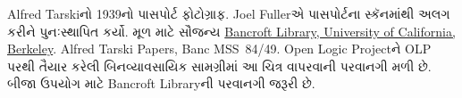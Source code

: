 Alfred Tarskiનો 1939નો પાસપોર્ટ ફોટોગ્રાફ. Joel Fullerએ પાસપોર્ટના સ્કૅનમાંથી
અલગ કરીને પુનઃસ્થાપિત કર્યો. મૂળ માટે સૌજન્ય
\href{http://www.lib.berkeley.edu/libraries/bancroft-library}{Bancroft Library,
University of California, Berkeley}. Alfred Tarski Papers, Banc MSS~84/49.
Open Logic Projectને OLP પરથી તૈયાર કરેલી બિનવ્યાવસાયિક સામગ્રીમાં આ ચિત્ર
વાપરવાની પરવાનગી મળી છે. બીજા ઉપયોગ માટે Bancroft Libraryની પરવાનગી જરૂરી છે.
